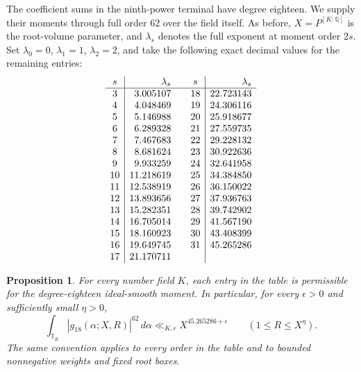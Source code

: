 \documentclass[11pt]{amsart}
\newtheorem{proposition}[theorem]{Proposition}
\theoremstyle{definition}
\numberwithin{equation}{section}
\begin{document}
The coefficient sums in the ninth-power terminal have degree eighteen.
We supply their moments through full order $62$ over the field itself.
As before, $X=P^{[K:\mathbb Q]}$ is the root-volume parameter, and
$\lambda_s$ denotes the full exponent at moment order $2s$.
Set $\lambda_0=0$, $\lambda_1=1$, $\lambda_2=2$, and take the following
exact decimal values for the remaining entries:
\[
\begin{array}{c|r@{\qquad}c|r}
s&\lambda_s&s&\lambda_s\\\hline
3&3.005107&18&22.723143\\
4&4.048469&19&24.306116\\
5&5.146988&20&25.918677\\
6&6.289328&21&27.559735\\
7&7.467683&22&29.228132\\
8&8.681624&23&30.922636\\
9&9.933259&24&32.641958\\
10&11.218619&25&34.384850\\
11&12.538919&26&36.150022\\
12&13.893656&27&37.936763\\
13&15.282351&28&39.742902\\
14&16.705014&29&41.567190\\
15&18.160923&30&43.408399\\
16&19.649745&31&45.265286\\
17&21.170711&&
\end{array}
\]

\begin{proposition}\label{prop:degree18-field-seeds}
For every number field $K$, each entry in the table is permissible for
the degree-eighteen ideal-smooth moment. In particular, for every
$\epsilon>0$ and sufficiently small $\eta>0$,
\[
 \int_{\mathbb T_K}|g_{18}(\alpha;X,R)|^{62}\,d\alpha
       \ll_{K,\epsilon}X^{45.265286+\epsilon}
       \qquad(1\le R\le X^\eta).
\]
The same convention applies to every order in the table and to bounded
nonnegative weights and fixed root boxes.
\end{proposition}
\end{document}
